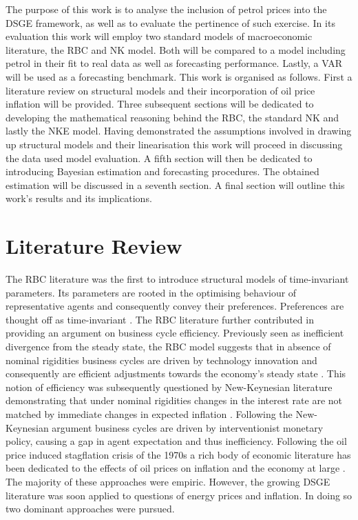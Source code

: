 \documentclass[12pt,a4paper,english]{article} %
\let\oldsection\section
\renewcommand\section{\clearpage\oldsection}
\begin{document}
	 The purpose of this work is to analyse the inclusion of petrol prices into the DSGE framework, as well as to evaluate the pertinence of such exercise. In its evaluation this work will employ two standard models of macroeconomic literature, the RBC and NK model. Both will be compared to a model including petrol in their fit to real data as well as forecasting performance. Lastly, a \ac{VAR} will be used as a forecasting benchmark. This work is organised as follows. First a literature review on structural models and their incorporation of oil price inflation will be provided. Three subsequent sections will be dedicated to developing the mathematical reasoning behind the RBC, the standard NK and lastly the \ac{NKE} model. Having demonstrated the assumptions involved in drawing up structural models and their linearisation this work will proceed in discussing the data used model evaluation. A fifth section will then be dedicated to introducing Bayesian estimation and forecasting procedures. The obtained estimation will  be discussed in a seventh section. A final section will outline this work's results and its implications.
	 
	\section{Literature Review}
	The RBC literature was the first to introduce structural models of time-invariant parameters. Its parameters are rooted in the optimising behaviour of representative agents and consequently convey their preferences. Preferences are thought off as time-invariant \cite{prescott_theory_1986}. The RBC literature further contributed in providing an argument on business cycle efficiency. Previously seen as inefficient divergence from the steady state, the RBC model suggests that in absence of nominal rigidities business cycles are driven by technology innovation and consequently are efficient adjustments towards the economy's steady state \cite{christiano_current_1992}. This notion of efficiency was subsequently questioned by New-Keynesian literature demonstrating that under nominal rigidities changes in the interest rate are not matched by immediate changes in expected inflation \cite{gali_monetary_2008}. Following the New-Keynesian argument business cycles are driven by interventionist monetary policy, causing a gap in agent expectation and thus inefficiency\cite{gali_monetary_2008}. Following the oil price induced stagflation crisis of the 1970s a rich body of economic literature has been dedicated to the effects of oil prices on inflation and the economy at large \cite{barsky_oil_2002, bernanke_systematic_1997}. The majority of these approaches were empiric. However, the growing DSGE literature was soon applied to questions of energy prices and inflation. In doing so two dominant approaches were pursued.
	
\end{document}
